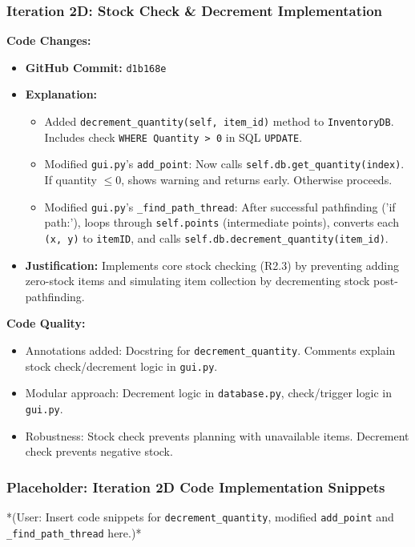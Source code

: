 \subsubsection{Iteration 2D: Stock Check \& Decrement Implementation}

\textbf{Code Changes:}
\begin{itemize}
	\item \textbf{GitHub Commit:} \verb|d1b168e|
	\item \textbf{Explanation:}
	\begin{itemize}
		\item Added \verb|decrement_quantity(self, item_id)| method to \verb|InventoryDB|. Includes check \verb|WHERE Quantity > 0| in SQL \verb|UPDATE|.
		\item Modified \verb|gui.py|'s \verb|add_point|: Now calls \verb|self.db.get_quantity(index)|. If quantity $\le 0$, shows warning and returns early. Otherwise proceeds.
		\item Modified \verb|gui.py|'s \verb|_find_path_thread|: After successful pathfinding ('if path:'), loops through \verb|self.points| (intermediate points), converts each \verb|(x, y)| to \verb|itemID|, and calls \verb|self.db.decrement_quantity(item_id)|.
	\end{itemize}
	\item \textbf{Justification:} Implements core stock checking (R2.3) by preventing adding zero-stock items and simulating item collection by decrementing stock post-pathfinding.
\end{itemize}

\textbf{Code Quality:}
\begin{itemize}
	\item Annotations added: Docstring for \verb|decrement_quantity|. Comments explain stock check/decrement logic in \verb|gui.py|.
	\item Modular approach: Decrement logic in \verb|database.py|, check/trigger logic in \verb|gui.py|.
	\item Robustness: Stock check prevents planning with unavailable items. Decrement check prevents negative stock.
\end{itemize}

\newpage
\subsubsection*{Placeholder: Iteration 2D Code Implementation Snippets}
*(User: Insert code snippets for \verb|decrement_quantity|, modified \verb|add_point| and \verb|_find_path_thread| here.)*
\newpage

